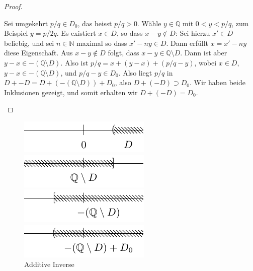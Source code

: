 \documentclass[../main.tex]{subfiles}
\begin{document}
\begin{proof}
\begin{itemize}
      Sei umgekehrt
      $p/q \in D_{0}$, das heisst $p/q > 0$. Wähle $y \in \mathbb Q$
      mit $0 < y < p/q$, zum Beispiel $y = p/2q$.
      Es existiert $x \in D$, so dass $x - y \notin D$:
      Sei hierzu $x' \in D$ beliebig, und sei $n \in \mathbb N$ maximal
      so dass $x' -ny \in D$. Dann erfüllt $x = x' - ny$ diese Eigenschaft.
      Aus $x - y \notin D$ folgt, dass $x- y \in \mathbb Q \setminus D$.
      Dann ist aber $y - x \in - (\mathbb Q \setminus D)$.
      Also ist $p/q = x + (y-x) + (p/q - y)$, wobei
      $x \in D$, $y - x \in -(\mathbb Q \setminus D)$, und $p/q - y \in D_{0}$.
      Also liegt $p/q$ in $D + -D = D + (-(\mathbb Q \setminus D)) + D_{0}$,
      also $D + (-D) \supset D_{0}$. Wir haben beide Inklusionen gezeigt,
      und somit
      erhalten wir $D + (-D) = D_{0}$. \qedhere
  \end{itemize}
\end{proof}

\begin{figure}[htb]
  \centering
  \begin{minipage}{0.4\linewidth}
    \centering
    \includegraphics{images/dedekind-additiv-invers1}
  \end{minipage}%
  \begin{minipage}{0.4\linewidth}
    \centering
    \includegraphics{images/dedekind-additiv-invers2}
  \end{minipage}
  \begin{minipage}{0.4\linewidth}
    \centering
    \includegraphics{images/dedekind-additiv-invers3}
  \end{minipage}%
  \begin{minipage}{0.4\linewidth}
    \centering
    \includegraphics{images/dedekind-additiv-invers4}
  \end{minipage}
  \caption{Additive Inverse}%
  \label{fig:additiv-dedekind}
\end{figure}
\end{document}
